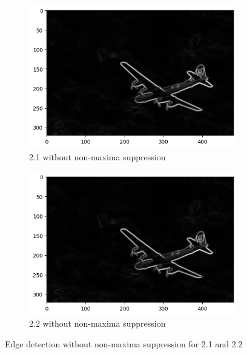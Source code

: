 \documentclass[12pt]{article}
\begin{document}
\begin{figure}[H]
    \centering
    \begin{subfigure}{0.45\textwidth} %
        \centering
        \includegraphics[width=\textwidth]{images/2_1_without_non_maxima.png}
        \caption{2.1 without non-maxima suppression}
        \label{fig:sub1}
    \end{subfigure}
    \hfill %
    \begin{subfigure}{0.45\textwidth} %
        \centering
        \includegraphics[width=\textwidth]{images/2_2_without_non_maxima.png}
        \caption{2.2 without non-maxima suppression}
        \label{fig:sub2}
    \end{subfigure}
    \caption{Edge detection without non-maxima suppression for 2.1 and 2.2}
    \label{fig:main}
\end{figure}
\end{document}
